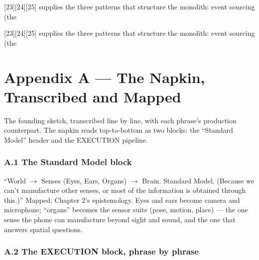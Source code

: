 {[}23{]}{[}24{]}{[}25{]} supplies the three patterns that structure the monolith: event sourcing (the

{[}23{]}{[}24{]}{[}25{]} supplies the three patterns that structure the monolith: event sourcing (the

\chapter*{Appendix A --- The Napkin, Transcribed and Mapped}\label{appendix-a-the-napkin-transcribed-and-mapped}

The founding sketch, transcribed line by line, with each phrase's production counterpart. The napkin reads top-to-bottom as two blocks: the ``Standard Model'' header and the EXECUTION pipeline.

\subsection{A.1 The Standard Model block}\label{a.1-the-standard-model-block}

``World \(\rightarrow\) Senses (Eyes, Ears, Organs) \(\rightarrow\) Brain. Standard Model. (Because we can't manufacture other senses, or most of the information is obtained through this.)'' Mapped: Chapter 2's epistemology. Eyes and ears become camera and microphone; ``organs'' becomes the sensor suite (pose, motion, place) --- the one sense the phone can manufacture beyond sight and sound, and the one that answers spatial questions.

\subsection{A.2 The EXECUTION block, phrase by phrase}\label{a.2-the-execution-block-phrase-by-phrase}

